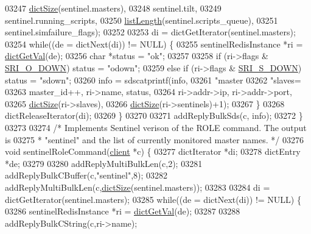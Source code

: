 \begin{DoxyCode}
{{{{{{{{{{{{{{{{{{{{{{{{{{{{{{{{{{{{{{{{{{{{{{{{{{{{{{{{{{{{{{{{{{{{{03247             \hyperlink{dict_8h_af193430dd3d5579a52b194512f72c1f0}{dictSize}(sentinel.masters),
03248             sentinel.tilt,
03249             sentinel.running\_scripts,
03250             \hyperlink{adlist_8h_afde0ab079f934670e82119b43120e94b}{listLength}(sentinel.scripts\_queue),
03251             sentinel.simfailure\_flags);
03252 
03253         di = dictGetIterator(sentinel.masters);
03254         \textcolor{keywordflow}{while}((de = dictNext(di)) != NULL) \{
03255             sentinelRedisInstance *ri = \hyperlink{dict_8h_ae8d2cc391873b2bea2b87c4f80f43120}{dictGetVal}(de);
03256             \textcolor{keywordtype}{char} *status = \textcolor{stringliteral}{"ok"};
03257 
03258             \textcolor{keywordflow}{if} (ri->flags & \hyperlink{sentinel_8c_a3bbbca05543cd9d9f86d276e2c7c719c}{SRI\_O\_DOWN}) status = \textcolor{stringliteral}{"odown"};
03259             \textcolor{keywordflow}{else} \textcolor{keywordflow}{if} (ri->flags & \hyperlink{sentinel_8c_a8e26596c8bde451c2dd9cecb2c3046d4}{SRI\_S\_DOWN}) status = \textcolor{stringliteral}{"sdown"};
03260             info = sdscatprintf(info,
03261                 \textcolor{stringliteral}{"master%
03262                 \textcolor{stringliteral}{"slaves=%
03263                 master\_id++, ri->name, status,
03264                 ri->addr->ip, ri->addr->port,
03265                 \hyperlink{dict_8h_af193430dd3d5579a52b194512f72c1f0}{dictSize}(ri->slaves),
03266                 \hyperlink{dict_8h_af193430dd3d5579a52b194512f72c1f0}{dictSize}(ri->sentinels)+1);
03267         \}
03268         dictReleaseIterator(di);
03269     \}
03270 
03271     addReplyBulkSds(c, info);
03272 \}
03273 
03274 \textcolor{comment}{/* Implements Sentinel verison of the ROLE command. The output is}
03275 \textcolor{comment}{ * "sentinel" and the list of currently monitored master names. */}
03276 \textcolor{keywordtype}{void} sentinelRoleCommand(\hyperlink{structclient}{client} *c) \{
03277     dictIterator *di;
03278     dictEntry *de;
03279 
03280     addReplyMultiBulkLen(c,2);
03281     addReplyBulkCBuffer(c,\textcolor{stringliteral}{"sentinel"},8);
03282     addReplyMultiBulkLen(c,\hyperlink{dict_8h_af193430dd3d5579a52b194512f72c1f0}{dictSize}(sentinel.masters));
03283 
03284     di = dictGetIterator(sentinel.masters);
03285     \textcolor{keywordflow}{while}((de = dictNext(di)) != NULL) \{
03286         sentinelRedisInstance *ri = \hyperlink{dict_8h_ae8d2cc391873b2bea2b87c4f80f43120}{dictGetVal}(de);
03287 
03288         addReplyBulkCString(c,ri->name);
}}}}}}}}}}}}}}}}}}}}}}}}}}}}}}}}}}}}}}}}}}}}}}}}}}}}}}}}}}}}}}}}}}}}}}}
\end{DoxyCode}
